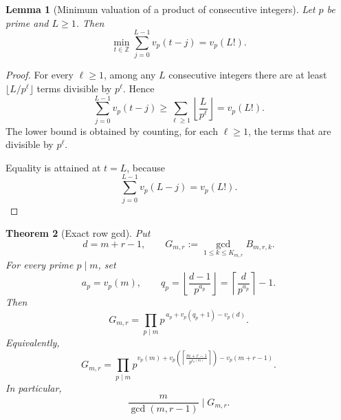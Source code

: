 \documentclass[11pt]{article}
\newtheorem{theorem}{Theorem}[section]
\newtheorem{lemma}[theorem]{Lemma}
\theoremstyle{definition}
\theoremstyle{remark}
\newcommand{\Z}{\mathbb Z}
\begin{document}
\begin{lemma}[Minimum valuation of a product of consecutive integers]
\label{lem:consecutive-vp}
Let $p$ be prime and $L\ge1$. Then
\[
 \min_{t\in\Z}\sum_{j=0}^{L-1}v_p(t-j)=v_p(L!).
\]
\end{lemma}

\begin{proof}
For every $\ell\ge1$, among any $L$ consecutive integers there are at
least $\lfloor L/p^\ell\rfloor$ terms divisible by $p^\ell$. Hence
\[
 \sum_{j=0}^{L-1}v_p(t-j)
 \ge
 \sum_{\ell\ge1}\left\lfloor\frac{L}{p^\ell}\right\rfloor
 =v_p(L!).
\]
The lower bound is obtained by counting, for each $\ell\ge1$, the
terms that are divisible by $p^\ell$.

Equality is attained at $t=L$, because
\[
 \sum_{j=0}^{L-1}v_p(L-j)=v_p(L!).
\]
\end{proof}

\begin{theorem}[Exact row gcd]
\label{thm:exact-gcd}
Put
\[
 d=m+r-1,
 \qquad
 G_{m,r}:=\gcd_{1\le k\le K_{m,r}}B_{m,r,k}.
\]
For every prime $p\mid m$, set
\[
 a_p=v_p(m),
 \qquad
 q_p=\left\lfloor\frac{d-1}{p^{a_p}}\right\rfloor
     =\left\lceil\frac{d}{p^{a_p}}\right\rceil-1.
\]
Then
\begin{equation}
\label{eq:exact-gcd}
 G_{m,r}
 =
 \prod_{p\mid m}
 p^{\,a_p+v_p(q_p+1)-v_p(d)}.
\end{equation}
Equivalently,
\[
 G_{m,r}
 =
 \prod_{p\mid m}
 p^{
 v_p(m)
 +v_p\!\left(
 \left\lceil\frac{m+r-1}{p^{v_p(m)}}\right\rceil
 \right)
 -v_p(m+r-1)
 }.
\]
In particular,
\[
 \frac{m}{\gcd(m,r-1)}\mid G_{m,r}.
\]
\end{theorem}
\end{document}
